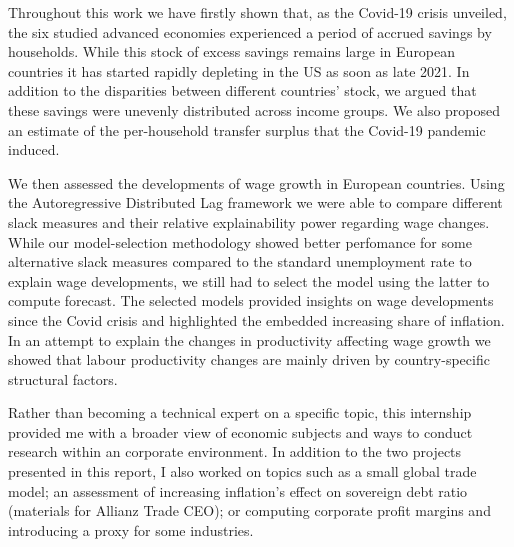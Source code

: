 \quad Throughout this work we have firstly shown that, as the Covid-19 crisis unveiled, the six studied advanced economies experienced a period of accrued savings by households. 
While this stock of excess savings remains large in European countries it has started rapidly depleting in the US as soon as late 2021. 
In addition to the disparities between different countries' stock, we argued that these savings were unevenly distributed across income groups.
We also proposed an estimate of the per-household transfer surplus that the Covid-19 pandemic induced.

We then assessed the developments of wage growth in European countries. 
Using the Autoregressive Distributed Lag framework we were able to compare different slack measures and their relative explainability power regarding wage changes.
While our model-selection methodology showed better perfomance for some alternative slack measures compared to the standard unemployment rate to explain wage developments, we still had to select the model using the latter to compute forecast. 
The selected models provided insights on wage developments since the Covid crisis and highlighted the embedded increasing share of inflation. In an attempt to explain the changes in productivity affecting wage growth we showed that labour productivity changes are mainly driven by country-specific structural factors.

Rather than becoming a technical expert on a specific topic, this internship provided me with a broader view of economic subjects and ways to conduct research within an corporate environment. 
In addition to the two projects presented in this report, I also worked on topics such as a small global trade model\cite{az_trade}; an assessment of increasing inflation’s effect on sovereign debt ratio (materials for Allianz Trade CEO\cite{az_debt}); or computing corporate profit margins and introducing a proxy for some industries\cite{az_margins}.